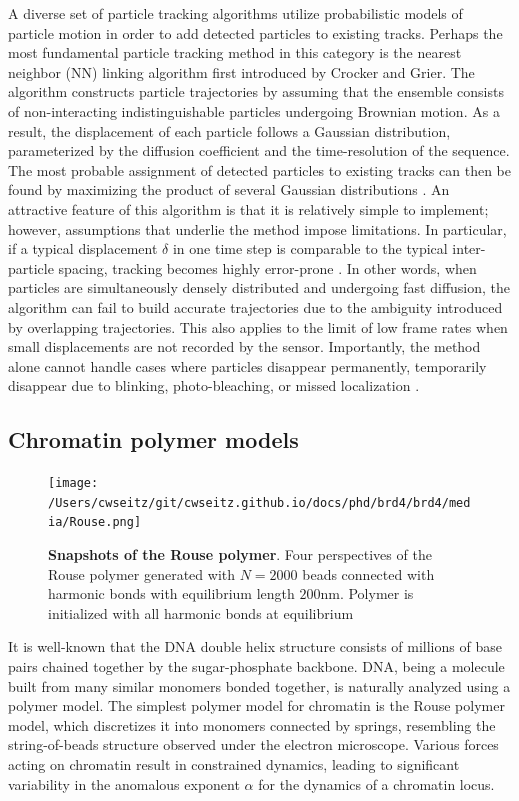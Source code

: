 A diverse set of particle tracking algorithms utilize probabilistic models of particle motion in order to add detected particles to existing tracks. Perhaps the most fundamental particle tracking method in this category is the nearest neighbor (NN) linking algorithm first introduced by Crocker and Grier. The algorithm constructs particle trajectories by assuming that the ensemble consists of non-interacting indistinguishable particles undergoing Brownian motion. As a result, the displacement of each particle follows a Gaussian distribution, parameterized by the diffusion coefficient and the time-resolution of the sequence. The most probable assignment of detected particles to existing tracks can then be found by maximizing the product of several Gaussian distributions \parencite{Crocker1996}. An attractive feature of this algorithm is that it is relatively simple to implement; however, assumptions that underlie the method impose limitations. In particular, if a typical displacement $\delta$ in one time step is comparable to the typical inter-particle spacing, tracking becomes highly error-prone \parencite{Crocker1996}. In other words, when particles are simultaneously densely distributed and undergoing fast diffusion, the algorithm can fail to build accurate trajectories due to the ambiguity introduced by overlapping trajectories. This also applies to the limit of low frame rates when small displacements are not recorded by the sensor. Importantly, the method alone cannot handle cases where particles disappear permanently, temporarily disappear due to blinking, photo-bleaching, or missed localization \parencite{Sbalzarini2005}.

\subsection{Chromatin polymer models}

\begin{figure}[t]
\texttt{[image: /Users/cwseitz/git/cwseitz.github.io/docs/phd/brd4/brd4/media/Rouse.png]}
\caption{\textbf{Snapshots of the Rouse polymer}. Four perspectives of the Rouse polymer generated with $N=2000$ beads connected with harmonic bonds with equilibrium length $200\mathrm{nm}$. Polymer is initialized with all harmonic bonds at equilibrium}
\label{fig:fig19}
\end{figure}


It is well-known that the DNA double helix structure consists of millions of base pairs chained together by the sugar-phosphate backbone. DNA, being a molecule built from many similar monomers bonded together, is naturally analyzed using a polymer model. The simplest polymer model for chromatin is the Rouse polymer model, which discretizes it into monomers connected by springs, resembling the string-of-beads structure observed under the electron microscope. Various forces acting on chromatin result in constrained dynamics, leading to significant variability in the anomalous exponent $\alpha$ for the dynamics of a chromatin locus.


